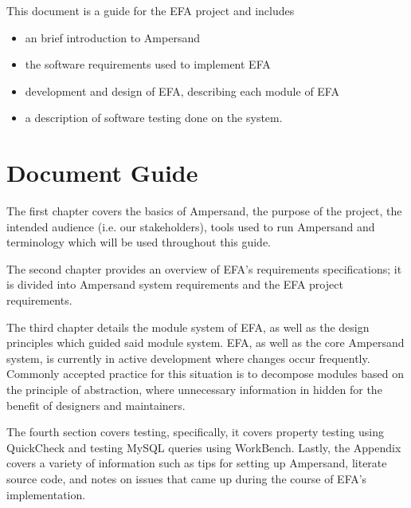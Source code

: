 \documentclass[journal,12pt,onecolumn,draftclsnofoot]{report}
\begin{document}
This document is a guide for the EFA project and includes 

\begin{itemize}
\item an brief introduction 
to \gls{Ampersand}
\item the software requirements used to implement EFA
\item development and design of EFA, describing each module of EFA
\item a description of software testing done on the system.
\end{itemize}

\section{Document Guide}

The first chapter covers 
the basics of \gls{Ampersand}, the purpose of the project, the intended audience 
(i.e. our stakeholders), tools used to run \gls{Ampersand} and terminology which will 
be used throughout this guide. 

The second chapter provides an overview of EFA's requirements specifications; 
it is divided into \gls{Ampersand} system requirements and the EFA project 
requirements.

The third chapter details the module system of EFA, as well as the design principles
which guided said module system. EFA, as well as the core Ampersand system, is
currently in active development where changes occur frequently. Commonly
accepted practice for this situation is to decompose modules based on the
principle of abstraction, where unnecessary information in hidden for the
benefit of designers and maintainers\citep{modStruct,Parnas1972}.

The fourth section covers testing, specifically, it covers property testing 
using QuickCheck and testing MySQL queries using WorkBench.
Lastly, the Appendix 
covers a variety of information such as tips for setting up 
\gls{Ampersand}, literate source code, and notes on issues that came up during the 
course of EFA's 
implementation. 
\end{document}

